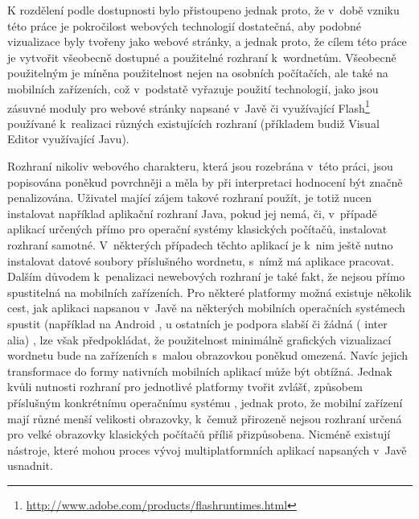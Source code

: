 \documentclass[a4paper,11pt,openany,twoside]{book}
\begin{document}
				K rozdělení podle dostupnosti bylo přistoupeno jednak proto, že v~době vzniku této práce je pokročilost webových technologií dostatečná, aby podobné vizualizace byly tvořeny jako webové stránky, a jednak proto, že cílem této práce je vytvořit všeobecně dostupné a použitelné rozhraní k~wordnetům. Všeobecně použitelným je míněna použitelnost nejen na osobních počítačích, ale také na mobilních zařízeních, což v~podstatě vyřazuje použití technologií, jako jsou zásuvné moduly pro webové stránky napsané v~Javě či využívající Flash\footnote{\url{http://www.adobe.com/products/flashruntimes.html}} používané k~realizaci různých existujících rozhraní (příkladem budiž Visual Editor využívající Javu). 

				Rozhraní nikoliv webového charakteru, která jsou rozebrána v~této práci, jsou popisována poněkud povrchněji a měla by při interpretaci hodnocení být značně penalizována. Uživatel mající zájem takové rozhraní použít, je totiž nucen instalovat například aplikační rozhraní Java, pokud jej nemá, či, v~případě aplikací určených přímo pro operační systémy klasických počítačů, instalovat rozhraní samotné. V~některých případech těchto aplikací je k~nim ještě nutno instalovat datové soubory příslušného wordnetu, s~nímž má aplikace pracovat. Dalším důvodem k~penalizaci newebových rozhraní je také fakt, že nejsou přímo spustitelná na mobilních zařízeních. Pro některé platformy možná existuje několik cest, jak aplikaci napsanou v~Javě na některých mobilních operačních systémech spustit (například na Android \parencite{SX92854}, u ostatních je podpora slabší či žádná (\parencite{SX15501535,SX1193541} inter alia)%
				, lze však předpokládat, že použitelnost minimálně grafických vizualizací wordnetu bude na zařízeních s~malou obrazovkou poněkud omezená.  Navíc jejich transformace do formy nativních mobilních aplikací může být obtížná. Jednak kvůli nutnosti rozhraní pro jednotlivé platformy tvořit zvlášť, způsobem příslušným konkrétnímu operačnímu systému \parencite{gronli2014mobile}, jednak proto, že mobilní zařízení mají různé menší velikosti obrazovky, k~čemuž přirozeně nejsou rozhraní určená pro velké obrazovky klasických počítačů příliš přizpůsobena. Nicméně existují nástroje, které mohou proces vývoj multiplatformních aplikací napsaných v~Javě usnadnit. \parencite{mafintro}
\end{document}
